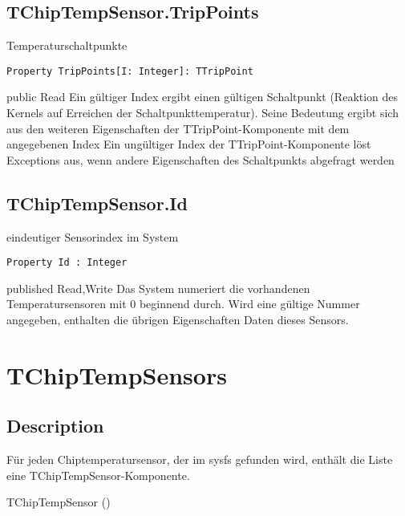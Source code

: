 \subsection{TChipTempSensor.TripPoints}
\label{computer:chiptemp:tchiptempsensor:trippoints}
\begin{FPCList}
\Synopsis
Temperaturschaltpunkte\Declaration 

\begin{verbatim}
Property TripPoints[I: Integer]: TTripPoint
\end{verbatim}
\Visibility
public
\Access
Read
\Description
Ein gültiger Index ergibt einen gültigen Schaltpunkt (Reaktion des Kernels auf Erreichen der Schaltpunkttemperatur). Seine Bedeutung ergibt sich aus den weiteren Eigenschaften der TTripPoint-Komponente mit dem angegebenen Index\Errors
Ein ungültiger Index der TTripPoint-Komponente löst Exceptions aus, wenn andere Eigenschaften des Schaltpunkts abgefragt werden\end{FPCList}
\subsection{TChipTempSensor.Id}
\label{computer:chiptemp:tchiptempsensor:id}
\begin{FPCList}
\Synopsis
eindeutiger Sensorindex im System\Declaration 

\begin{verbatim}
Property Id : Integer
\end{verbatim}
\Visibility
published
\Access
Read,Write
\Description
Das System numeriert die vorhandenen Temperatursensoren mit 0 beginnend durch. Wird eine gültige Nummer angegeben, enthalten die übrigen Eigenschaften Daten dieses Sensors.\end{FPCList}
\section{TChipTempSensors}
\label{computer:chiptemp:tchiptempsensors}
\subsection{Description}
Für jeden Chiptemperatursensor, der im sysfs gefunden wird, enthält die Liste eine TChipTempSensor-Komponente.
\begin{FPCList}
\SeeAlso
TChipTempSensor (\pageref{computer:chiptemp:tchiptempsensor})\end{FPCList}
